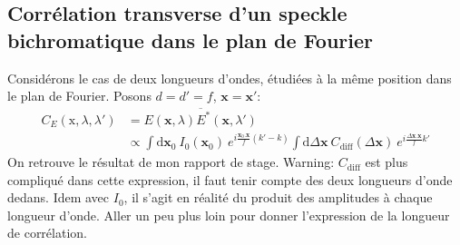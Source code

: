 \subsection{Corrélation transverse d'un speckle bichromatique dans le plan de Fourier}
Considérons le cas de deux longueurs d'ondes, étudiées à la même position dans le plan de Fourier. Posons $d=d'=f$, $\mathbf{x}=\mathbf{x}'$:
\begin{align}
C_E(\mathrm{x},\lambda,\lambda')&=\overline{E(\mathbf{x},\lambda)E^*(\mathbf{x},\lambda')}\\
&\propto \int{\mathrm{d}\mathbf{x}_0 \: I_0(\mathbf{x}_0) \: e^{i\frac{\mathbf{x}_0.\mathbf{x}}{f}(k'-k)} \int{\mathrm{d}\Delta\mathbf{x} \: C_{\mathrm{diff}}(\Delta\mathbf{x}) \: e^{i\frac{\Delta\mathbf{x}.\mathbf{x}}{f}k'}}}
\end{align}
On retrouve le résultat de mon rapport de stage. Warning: $C_{\mathrm{diff}}$ est plus compliqué dans cette expression, il faut tenir compte des deux longueurs d'onde dedans. Idem avec $I_0$, il s'agit en réalité du produit des amplitudes à chaque longueur d'onde. Aller un peu plus loin pour donner l'expression de la longueur de corrélation.


